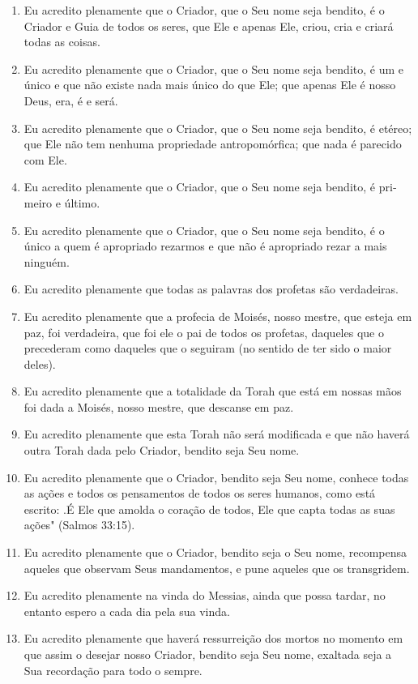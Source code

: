 \begin{enumerate}

\item Eu acredito plenamente que o Criador, que o Seu nome seja bendito, é o
Criador e Guia de todos os seres, que Ele e apenas Ele, criou, cria e
criará todas as coisas.

\item Eu acredito plenamente que o Criador, que o Seu nome seja bendito, é
um e único e que não existe nada mais único do que Ele; que apenas Ele
é nos­so Deus, era, é e será.

\item Eu acredito plenamente que o Criador, que o Seu nome seja bendito, é
eté­reo; que Ele não tem nenhuma propriedade antropomórfica; que nada
é parecido com Ele.

\item Eu acredito plenamente que o Criador, que o Seu nome seja bendito, é
pri­meiro e último.

\item Eu acredito plenamente que o Criador, que o Seu nome seja bendito, é o
único a quem é apropriado rezarmos e que não é apropriado rezar a mais
ninguém.

\item Eu acredito plenamente que todas as palavras dos profetas são
verdadeiras.

\item Eu acredito plenamente que a profecia de Moisés, nosso mestre, que
esteja em paz, foi verdadeira, que foi ele o pai de todos os profetas,
daqueles que o precederam como daqueles que o seguiram (no sentido de
ter sido o maior deles).

\item Eu acredito plenamente que a totalidade da Torah que está em nossas
mãos foi dada a Moisés, nosso mestre, que descanse em paz.

\item Eu acredito plenamente que esta Torah não será modificada e que não
ha­verá outra Torah dada pelo Criador, bendito seja Seu nome.

\item Eu acredito plenamente que o Criador, bendito seja Seu nome, conhece
todas as ações e todos os pensamentos de todos os seres humanos, como
está escrito: .É Ele que amolda o coração de todos,
Ele que capta todas as suas ações" (Salmos 33:15).

\item Eu acredito plenamente que o Criador, bendito seja o Seu nome,
recom­pensa aqueles que observam Seus mandamentos, e pune aqueles que
os transgridem.

\item Eu acredito plenamente na vinda do Messias, ainda que possa tardar, no
entanto espero a cada dia pela sua vinda.

\item Eu acredito plenamente que haverá ressurreição dos mortos no momento
em que assim o desejar nosso Criador, bendito seja Seu nome, exaltada
seja a Sua recordação para todo o sempre.

\end{enumerate}



